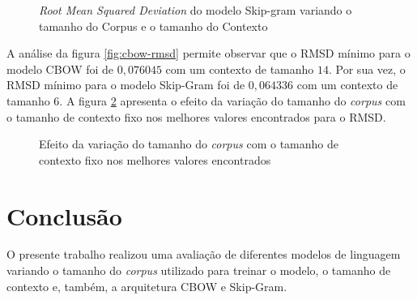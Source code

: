 \documentclass[12pt,openright,twoside,a4paper,article,brazil]{abntex2}
\begin{document}
\begin{figure}[h]
	\centering
	\caption{\emph{Root Mean Squared Deviation} do modelo Skip-gram variando o tamanho do Corpus e o tamanho do Contexto}
	\label{fig:skipgram-rmsd}
\end{figure}

A análise da figura \ref{fig:cbow-rmsd} permite observar que o RMSD mínimo para o modelo CBOW foi de $0,076045$ com um contexto de tamanho $14$. Por sua vez, o RMSD mínimo para o modelo Skip-Gram foi de $0,064336$ com um contexto de tamanho $6$. A figura \ref{fig:comparativo-geral} apresenta o efeito da variação do tamanho do \emph{corpus} com o tamanho de contexto fixo nos melhores valores encontrados para o RMSD.


\begin{figure}[h]
	\centering
	\caption{Efeito da variação do tamanho do \emph{corpus} com o tamanho de contexto fixo nos melhores valores encontrados}
	\label{fig:comparativo-geral}
\end{figure}


\section{Conclusão}
\label{sec:conclusao}

O presente trabalho realizou uma avaliação de diferentes modelos de linguagem variando o tamanho do \emph{corpus} utilizado para treinar o modelo, o tamanho de contexto e, também, a arquitetura CBOW e \mbox{Skip-Gram}.
\end{document}

